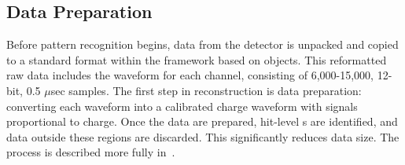 \subsection{Data Preparation}

Before pattern recognition begins, data from the  detector is
unpacked and copied to a standard format within the  framework based on  objects. 
This reformatted raw data includes the waveform for each channel, consisting of 6,000-15,000,  12-bit, 0.5 $\mu$sec samples. 
The first step in reconstruction is data preparation: converting each  waveform into a calibrated charge waveform with
signals proportional to charge. Once the data are prepared, hit-level s are identified, and data outside these regions are discarded.  This significantly reduces data size. The process is described more fully in~\cite{bib:docdb12349}. %

